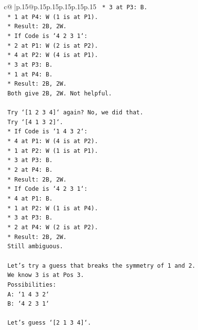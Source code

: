 \documentclass{article}
\begin{document}
{\begin{supertabular}{c@{$\;$}|p{.15\linewidth}@{}p{.15\linewidth}p{.15\linewidth}p{.15\linewidth}p{.15\linewidth}p{.15\linewidth}}
{{{\texttt{        *   3 at P3: B.} \\
\texttt{        *   1 at P4: W (1 is at P1).} \\
\texttt{        *   Result: 2B, 2W.} \\
\texttt{    *   If Code is `4 2 3 1`:} \\
\texttt{        *   2 at P1: W (2 is at P2).} \\
\texttt{        *   4 at P2: W (4 is at P1).} \\
\texttt{        *   3 at P3: B.} \\
\texttt{        *   1 at P4: B.} \\
\texttt{        *   Result: 2B, 2W.} \\
\texttt{    Both give 2B, 2W. Not helpful.} \\
\\ 
\texttt{    Try `{[}1 2 3 4{]}` again? No, we did that.} \\
\texttt{    Try `{[}4 1 3 2{]}`.} \\
\texttt{    *   If Code is `1 4 3 2`:} \\
\texttt{        *   4 at P1: W (4 is at P2).} \\
\texttt{        *   1 at P2: W (1 is at P1).} \\
\texttt{        *   3 at P3: B.} \\
\texttt{        *   2 at P4: B.} \\
\texttt{        *   Result: 2B, 2W.} \\
\texttt{    *   If Code is `4 2 3 1`:} \\
\texttt{        *   4 at P1: B.} \\
\texttt{        *   1 at P2: W (1 is at P4).} \\
\texttt{        *   3 at P3: B.} \\
\texttt{        *   2 at P4: W (2 is at P2).} \\
\texttt{        *   Result: 2B, 2W.} \\
\texttt{    Still ambiguous.} \\
\\ 
\texttt{    Let's try a guess that breaks the symmetry of 1 and 2.} \\
\texttt{    We know 3 is at Pos 3.} \\
\texttt{    Possibilities:} \\
\texttt{    A: `1 4 3 2`} \\
\texttt{    B: `4 2 3 1`} \\
\\ 
\texttt{    Let's guess `{[}2 1 3 4{]}`.} \\
}}}
\end{supertabular}}
\end{document}
